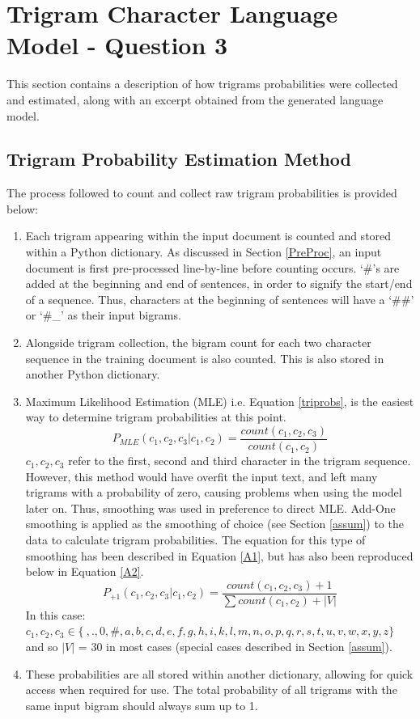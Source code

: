 \documentclass[12pt]{article}
\begin{document}
\section{Trigram Character Language Model - Question 3}
This section contains a description of how trigrams probabilities were collected and estimated, along with an excerpt obtained from the generated language model.
\subsection{Trigram Probability Estimation Method}
The process followed to count and collect raw trigram probabilities is provided below:
\begin{enumerate}
\item Each trigram appearing within the input document is counted and stored within a Python dictionary.  As discussed in Section \ref{PreProc}, an input document is first pre-processed line-by-line before counting occurs.  `\#'s are added at the beginning and end of sentences, in order to signify the start/end of a sequence.  Thus, characters at the beginning of sentences will have a `\#\#' or `\#\_' as their input bigrams.
\item Alongside trigram collection, the bigram count for each two character sequence in the training document is also counted. This is also stored in another Python dictionary.
\item Maximum Likelihood Estimation (MLE) i.e. Equation \ref{triprobs}, is the easiest way to determine trigram probabilities at this point.
\begin{equation}\label{triprobs}
P_{MLE}(c_{1},c_{2},c_{3}|c_{1},c_{2})= \dfrac{count(c_{1},c_{2},c_{3})}{count(c_1,c_2)} 
\end{equation}
$c_1,c_2,c_3$  refer to the first, second and third character in the trigram sequence.\\
\hfill\break
However, this method would have overfit the input text, and left many trigrams with a probability of zero, causing problems when using the model later on.  Thus, smoothing was used in preference to direct MLE.  Add-One smoothing is applied as the smoothing of choice (see Section \ref{assum}) to the data to calculate trigram probabilities.  The equation for this type of smoothing has been described in Equation \ref{A1}, but has also been reproduced below in Equation \ref{A2}.
\begin{equation}\label{A2}
 P_{+1}(c_{1},c_{2},c_{3} | c_{1},c_{2})= \dfrac{{count(c_{1},c_{2},c_{3})} + 1} {\sum count(c_1,c_2)+  |V|}
\end{equation}
In this case: $c_1,c_2,c_3 \in \{\ ,.,0,\#,a,b,c,d,e,f,g,h,i,k,l,m,n,o,p,q,r, s,t,u,v,w,x,y,z\}$ and so $|V|$ = 30 in most cases (special cases described in Section \ref{assum}).
\item  These probabilities are all stored within another dictionary, allowing for quick access when required for use.  The total probability of all trigrams with the same input bigram should always sum up to 1.
\end{enumerate} 
\end{document}
